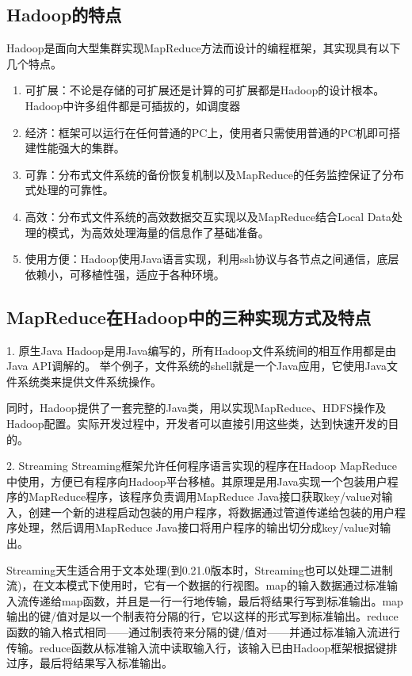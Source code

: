 
\subsection{Hadoop的特点}
Hadoop是面向大型集群实现MapReduce方法而设计的编程框架，其实现具有以下几个特点。

\begin{enumerate}
\item 可扩展：不论是存储的可扩展还是计算的可扩展都是Hadoop的设计根本。Hadoop中许多组件都是可插拔的，如调度器

\item 经济：框架可以运行在任何普通的PC上，使用者只需使用普通的PC机即可搭建性能强大的集群。

\item 可靠：分布式文件系统的备份恢复机制以及MapReduce的任务监控保证了分布式处理的可靠性。

\item 高效：分布式文件系统的高效数据交互实现以及MapReduce结合Local Data处理的模式，为高效处理海量的信息作了基础准备。

\item 使用方便：Hadoop使用Java语言实现，利用ssh协议与各节点之间通信，底层依赖小，可移植性强，适应于各种环境。
\end{enumerate}

\subsection{MapReduce在Hadoop中的三种实现方式及特点}

1. 原生Java
Hadoop是用Java编写的，所有Hadoop文件系统间的相互作用都是由Java API调解的。 举个例子，文件系统的shell就是一个Java应用，它使用Java文件系统类来提供文件系统操作。

同时，Hadoop提供了一套完整的Java类，用以实现MapReduce、HDFS操作及Hadoop配置。实际开发过程中，开发者可以直接引用这些类，达到快速开发的目的。

2. Streaming
Streaming框架允许任何程序语言实现的程序在Hadoop MapReduce中使用，方便已有程序向Hadoop平台移植。其原理是用Java实现一个包装用户程序的MapReduce程序，该程序负责调用MapReduce Java接口获取key/value对输入，创建一个新的进程启动包装的用户程序，将数据通过管道传递给包装的用户程序处理，然后调用MapReduce Java接口将用户程序的输出切分成key/value对输出。

Streaming天生适合用于文本处理(到0.21.0版本时，Streaming也可以处理二进制流)，在文本模式下使用时，它有一个数据的行视图。map的输入数据通过标准输入流传递给map函数，并且是一行一行地传输，最后将结果行写到标准输出。map输出的键/值对是以一个制表符分隔的行，它以这样的形式写到标准输出。reduce 函数的输入格式相同——通过制表符来分隔的键/值对——并通过标准输入流进行传输。reduce函数从标准输入流中读取输入行，该输入已由Hadoop框架根据键排过序，最后将结果写入标准输出。

